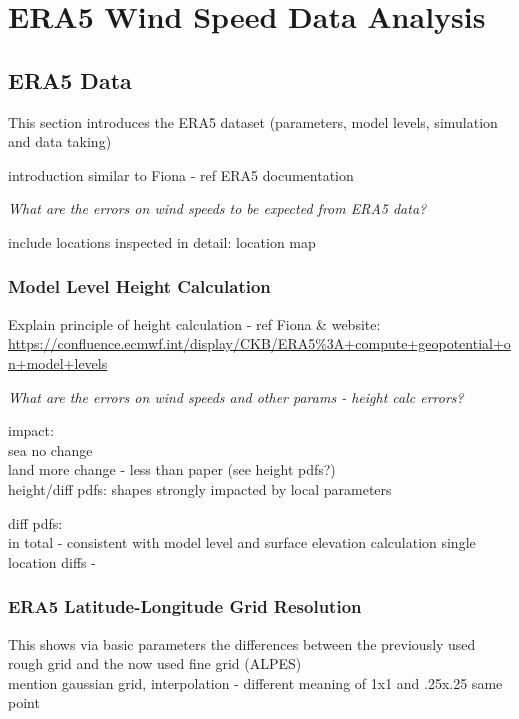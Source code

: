 
\chapter{ERA5 Wind Speed Data Analysis}
\label{sec:era5-data}
\section{ERA5 Data}
This section introduces the ERA5 dataset (parameters, model levels, simulation and data taking)

introduction similar to Fiona - ref ERA5 documentation

\textit{What are the errors on wind speeds to be expected from ERA5 data?}

include locations inspected in detail: location map

\subsection{Model Level Height Calculation}
Explain principle of height calculation - ref Fiona \& website:  \url{https://confluence.ecmwf.int/display/CKB/ERA5%3A+compute+geopotential+on+model+levels}

\textit{What are the errors on wind speeds and other params - height calc errors?}

impact:\\
sea no change\\ 
land more change - less than paper (see height pdfs?)\\

height/diff pdfs: shapes strongly impacted by local parameters

diff pdfs:\\
in total - consistent with model level and surface elevation calculation
single location diffs - 

\subsection{ERA5 Latitude-Longitude Grid Resolution}
This shows via basic parameters the differences between the previously used rough grid and the now used fine grid (ALPES)\\
mention gaussian grid, interpolation - different meaning of 1x1 and .25x.25 same point

